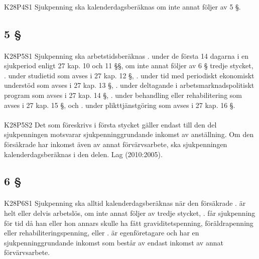 \documentclass[a4paper,notitlepage,openany,10pt]{book}
\begin{document}
\paragraph*{}
{\tiny K28P4S1}
Sjukpenning ska kalenderdagsberäknas om inte annat följer av 5 §.
\subsection*{5 §}
\paragraph*{}
{\tiny K28P5S1}
Sjukpenning ska arbetstidsberäknas
. under de första 14 dagarna i en sjukperiod enligt 27 kap. 10 och 11 §§, om inte annat följer av 6 § tredje stycket,
. under studietid som avses i 27 kap. 12 §,
. under tid med periodiskt ekonomiskt understöd som avses i 27 kap. 13 §,
. under deltagande i arbetsmarknadspolitiskt program som avses i 27 kap. 14 §,
. under behandling eller rehabilitering som avses i 27 kap. 15 §, och
. under plikttjänstgöring som avses i 27 kap. 16 §.
\paragraph*{}
{\tiny K28P5S2}
Det som föreskrivs i första stycket gäller endast till den del sjukpenningen motsvarar sjukpenninggrundande inkomst av anställning. Om den försäkrade har inkomst även av annat förvärvsarbete, ska sjukpenningen kalenderdagsberäknas i den delen.
Lag (2010:2005).
\subsection*{6 §}
\paragraph*{}
{\tiny K28P6S1}
Sjukpenning ska alltid kalenderdagsberäknas när den försäkrade
. är helt eller delvis arbetslös, om inte annat följer av tredje stycket,
. får sjukpenning för tid då han eller hon annars skulle ha fått graviditetspenning, föräldrapenning eller rehabiliteringspenning, eller
. är egenföretagare och har en sjukpenninggrundande inkomst som består av endast inkomst av annat förvärvsarbete.
\end{document}
